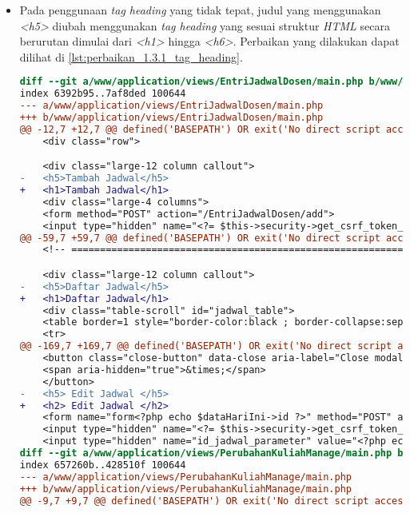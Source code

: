 \begin{itemize}
\item Pada penggunaan \textit{tag heading} yang tidak tepat, judul yang menggunakan \textit{<h5>} diubah menggunakan \textit{tag heading} yang sesuai struktur \textit{HTML} secara berurutan dimulai dari \textit{<h1>} hingga \textit{<h6>}. Perbaikan yang dilakukan dapat dilihat di \ref{lst:perbaikan_1.3.1_tag_heading}.
\begin{lstlisting}[frame=single, label={lst:perbaikan_1.3.1_tag_heading}, language=diff, caption=Perbaikan Kriteria Sukses 1.3.1 - Penggunaan \textit{Heading} Tidak Tepat]
diff --git a/www/application/views/EntriJadwalDosen/main.php b/www/application/views/EntriJadwalDosen/main.php
index 6392b95..7af8ded 100644
--- a/www/application/views/EntriJadwalDosen/main.php
+++ b/www/application/views/EntriJadwalDosen/main.php
@@ -12,7 +12,7 @@ defined('BASEPATH') OR exit('No direct script access allowed');
    <div class="row">

    <div class="large-12 column callout">
-   <h5>Tambah Jadwal</h5>
+   <h1>Tambah Jadwal</h1>
    <div class="large-4 columns">
    <form method="POST" action="/EntriJadwalDosen/add">
    <input type="hidden" name="<?= $this->security->get_csrf_token_name() ?>" value="<?= $this->security->get_csrf_hash() ?>" />
@@ -59,7 +59,7 @@ defined('BASEPATH') OR exit('No direct script access allowed');
    <!-- ===================================================================== Pembentukan Tabel ============================================================================= -->

    <div class="large-12 column callout">
-   <h5>Daftar Jadwal</h5>
+   <h1>Daftar Jadwal</h1>
    <div class="table-scroll" id="jadwal_table">
    <table border=1 style="border-color:black ; border-collapse:separate">
    <tr> 
@@ -169,7 +169,7 @@ defined('BASEPATH') OR exit('No direct script access allowed');
    <button class="close-button" data-close aria-label="Close modal" type="button">
    <span aria-hidden="true">&times;</span>
    </button>
-   <h5> Edit Jadwal </h5>
+   <h2> Edit Jadwal </h2>
    <form name="form<?php echo $dataHariIni->id ?>" method="POST" action="/EntriJadwalDosen/update/<?php echo $dataHariIni->id ?>">
    <input type="hidden" name="<?= $this->security->get_csrf_token_name() ?>" value="<?= $this->security->get_csrf_hash() ?>" />
    <input type="hidden" name="id_jadwal_parameter" value="<?php echo $dataHariIni->id ?>"> </a> <br>
diff --git a/www/application/views/PerubahanKuliahManage/main.php b/www/application/views/PerubahanKuliahManage/main.php
index 657260b..428510f 100644
--- a/www/application/views/PerubahanKuliahManage/main.php
+++ b/www/application/views/PerubahanKuliahManage/main.php
@@ -9,7 +9,7 @@ defined('BASEPATH') OR exit('No direct script access allowed');


\end{lstlisting}
\end{itemize}
